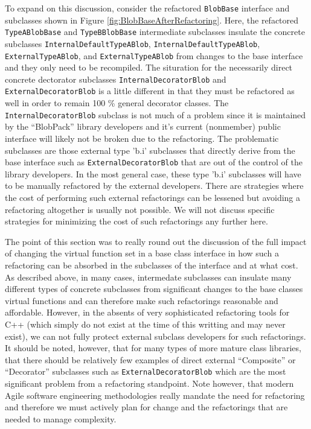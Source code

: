 \documentclass[pdf,ps2pdf,11pt]{SANDreport}
\begin{document}
To expand on this discussion, consider the refactored {}\texttt{Blob\-Base}
interface and subclasses shown in Figure {}\ref{fig:BlobBaseAfterRefactoring}.
Here, the refactored {}\texttt{Type\-A\-Blob\-Base} and
{}\texttt{Type\-B\-Blob\-Base} intermediate subclasses insulate the concrete
subclasses {}\texttt{Internal\-Default\-Type\-A\-Blob},
{}\texttt{Internal\-Default\-Type\-A\-Blob},
{}\texttt{External\-Type\-A\-Blob}, and {}\texttt{External\-Type\-A\-Blob}
from changes to the base interface and they only need to be recompiled.  The
situration for the necessarily direct concrete dectorator subclasses
{}\texttt{Internal\-Decorator\-Blob} and {}\texttt{External\-Decorator\-Blob}
is a little different in that they must be refactored as well in order to
remain 100 \% general decorator classes.  The
{}\texttt{Internal\-Decorator\-Blob} subclass is not much of a problem since
it is maintained by the ``BlobPack'' library developers and it's current
(nonmember) public interface will likely not be broken due to the refactoring.
The problematic subclasses are those external type 'b.i' subclasses that
directly derive from the base interface such as
{}\texttt{External\-Decorator\-Blob} that are out of the control of the
library developers.  In the most general case, these type 'b.i' subclasses
will have to be manually refactored by the external developers.  There are
strategies where the cost of performing such external refactorings can be
lessened but avoiding a refactoring altogether is usually not possible.  We
will not discuss specific strategies for minimizing the cost of such
refactorings any further here.

The point of this section was to really round out the discussion of the full
impact of changing the virtual function set in a base class interface in how
such a refactoring can be absorbed in the subclasses of the interface and at
what cost.  As described above, in many cases, intermedate subclasses can
insulate many different types of concrete subclasses from significant changes
to the base classes virtual functions and can therefore make such refactorings
reasonable and affordable.  However, in the absents of very sophisticated
refactoring tools for C++ (which simply do not exist at the time of this
writting and may never exist), we can not fully protect external subclass
developers for such refactorings.  It should be noted, however, that for many
types of more mature class libraries, that there should be relatively few
examples of direct external ``Composite'' or ``Decorator'' subclasses such as
{}\texttt{External\-Decorator\-Blob} which are the most significant problem
from a refactoring standpoint.  Note however, that modern Agile software
engineering methodologies really mandate the need for refactoring and
therefore we must actively plan for change and the refactorings that are
needed to manage complexity.
\end{document}
